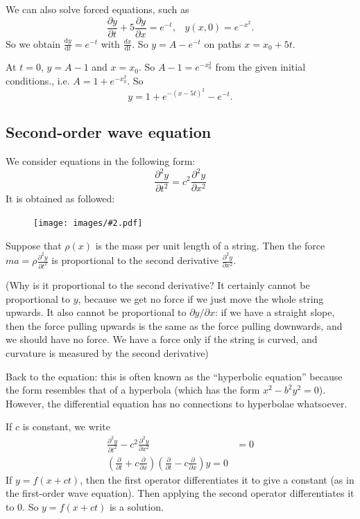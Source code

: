 \documentclass[a4paper]{article}
\theoremstyle{definition}
\renewcommand{\d}{\mathrm{d}}
\newcommand{\img}[2][]{\begin{figure}[ht]\centering\texttt{[image: images/\#2.pdf]}\end{figure}}
\begin{document}
We can also solve forced equations, such as
\[
\frac{\partial y}{\partial t} + 5\frac{\partial y}{\partial x} = e^{-t},\;\;\; y(x, 0) = e^{-x^2}.
\]
So we obtain $\frac{\d y}{\d t} = e^{-t}$ with $\frac{d x}{\d t}$. So $y = A - e^{-t}$ on paths $x = x_0 + 5t$.

At $t = 0$, $y = A - 1$ and $x = x_0$. So $A - 1 = e^{-x_0^2}$ from the given initial conditions., i.e. $A = 1 + e^{-x_0^2}$. So
\[
y = 1 + e^{-(x - 5t)^2} - e^{-t}.
\]
\subsection{Second-order wave equation}
We consider equations in the following form:
\[
\frac{\partial ^2 y}{\partial t^2} = c^2 \frac{\partial^2 y}{\partial x^2}
\]
It is obtained as followed:

\img{de_33}

Suppose that $\rho(x)$ is the mass per unit length of a string. Then the force $\displaystyle ma = \rho \frac{\partial ^2 y}{\partial t^2}$ is proportional to the second derivative $\displaystyle\frac{\partial^2 y}{\partial x^2}$.

(Why is it proportional to the second derivative? It certainly cannot be proportional to $y$, because we get no force if we just move the whole string upwards. It also cannot be proportional to $\partial y/\partial x$: if we have a straight slope, then the force pulling upwards is the same as the force pulling downwards, and we should have no force. We have a force only if the string is curved, and curvature is measured by the second derivative)

Back to the equation: this is often known as the ``hyperbolic equation'' because the form resembles that of a hyperbola (which has the form $x^2 - b^2 y^2 = 0$). However, the differential equation has no connections to hyperbolae whatsoever.

If $c$ is constant, we write
\begin{align*}
  \frac{\partial ^2 y}{\partial t^2} - c^2 \frac{\partial^2 y}{\partial x^2} &= 0\\
  \left(\frac{\partial}{\partial t} + c\frac{\partial}{\partial x}\right)\left(\frac{\partial}{\partial t} - c\frac{\partial}{\partial x}\right) y = 0
\end{align*}
If $y = f(x + ct)$, then the first operator differentiates it to give a constant (as in the first-order wave equation). Then applying the second operator differentiates it to $0$. So $y = f(x + ct)$ is a solution.
\end{document}
